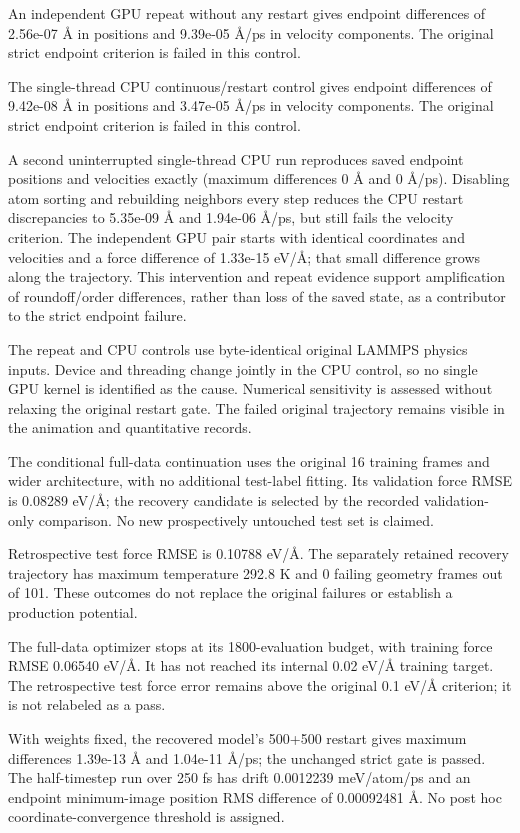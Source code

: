 An independent GPU repeat without any restart gives endpoint differences of 2.56e-07 \AA{} in positions and 9.39e-05 \AA/ps in velocity components. The original strict endpoint criterion is failed in this control.

The single-thread CPU continuous/restart control gives endpoint differences of 9.42e-08 \AA{} in positions and 3.47e-05 \AA/ps in velocity components. The original strict endpoint criterion is failed in this control.

A second uninterrupted single-thread CPU run reproduces saved endpoint positions and velocities exactly (maximum differences 0 \AA{} and 0 \AA/ps). Disabling atom sorting and rebuilding neighbors every step reduces the CPU restart discrepancies to 5.35e-09 \AA{} and 1.94e-06 \AA/ps, but still fails the velocity criterion. The independent GPU pair starts with identical coordinates and velocities and a force difference of 1.33e-15 eV/\AA; that small difference grows along the trajectory. This intervention and repeat evidence support amplification of roundoff/order differences, rather than loss of the saved state, as a contributor to the strict endpoint failure.

The repeat and CPU controls use byte-identical original LAMMPS physics inputs. Device and threading change jointly in the CPU control, so no single GPU kernel is identified as the cause. Numerical sensitivity is assessed without relaxing the original restart gate. The failed original trajectory remains visible in the animation and quantitative records.

The conditional full-data continuation uses the original 16 training frames and wider architecture, with no additional test-label fitting. Its validation force RMSE is 0.08289 eV/\AA; the recovery candidate is selected by the recorded validation-only comparison. No new prospectively untouched test set is claimed.

Retrospective test force RMSE is 0.10788 eV/\AA. The separately retained recovery trajectory has maximum temperature 292.8 K and 0 failing geometry frames out of 101. These outcomes do not replace the original failures or establish a production potential.

The full-data optimizer stops at its 1800-evaluation budget, with training force RMSE 0.06540 eV/\AA. It has not reached its internal 0.02 eV/\AA{} training target. The retrospective test force error remains above the original 0.1 eV/\AA{} criterion; it is not relabeled as a pass.

With weights fixed, the recovered model's 500+500 restart gives maximum differences 1.39e-13 \AA{} and 1.04e-11 \AA/ps; the unchanged strict gate is passed. The half-timestep run over 250 fs has drift 0.0012239 meV/atom/ps and an endpoint minimum-image position RMS difference of 0.00092481 \AA. No post hoc coordinate-convergence threshold is assigned.

